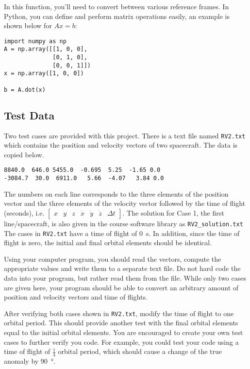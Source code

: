 \documentclass[11pt, reqno]{article}    %
\begin{document}
In this function, you'll need to convert between various reference frames. 
In Python, you can define and perform matrix operations easily, an example is shown below for \( A x = b \):
\begin{verbatim}
import numpy as np
A = np.array([[1, 0, 0],
              [0, 1, 0],
              [0, 0, 1]])
x = np.array([1, 0, 0])

b = A.dot(x)
\end{verbatim}
\subsection*{Test Data}
Two test cases are provided with this project. 
There is a text file named \texttt{RV2.txt} which contains the position and velocity vectors of two spacecraft. 
The data is copied below.
\begin{verbatim}
8840.0  646.0 5455.0  -0.695  5.25  -1.65 0.0
-3084.7  30.0  6911.0   5.66  -4.07   3.84 0.0
\end{verbatim}
The numbers on each line corresponds to the three elements of the position vector and the three elements of the velocity vector followed by the time of flight (seconds), i.e. \(\begin{bmatrix} x & y & z & \dot{x} & \dot{y} & \dot{z} & \Delta t \end{bmatrix}\).
The solution for Case 1, the first line/spacecraft, is also given in the course software library as \texttt{RV2\_solution.txt}
The cases in \texttt{RV2.txt} have a time of flight of \SI{0}{\second}.
In addition, since the time of flight is zero, the initial and final orbital elements should be identical.

Using your computer program, you should read the vectors, compute the appropriate values and write them to a separate text file.
Do not hard code the data into your program, but rather read them from the file. 
While only two cases are given here, your program should be able to convert an arbitrary amount of position and velocity vectors and time of flights.

After verifying both cases shown in \texttt{RV2.txt}, modify the time of flight to one orbital period. 
This should provide another test with the final orbital elements equal to the initial orbital elements. 
You are encouraged to create your own test cases to further verify you code. 
For example, you could test your code using a time of flight of \( \frac{1}{4} \) orbital period, which should cause a change of the true anomaly by \SI{90}{\degree}.
\end{document}
